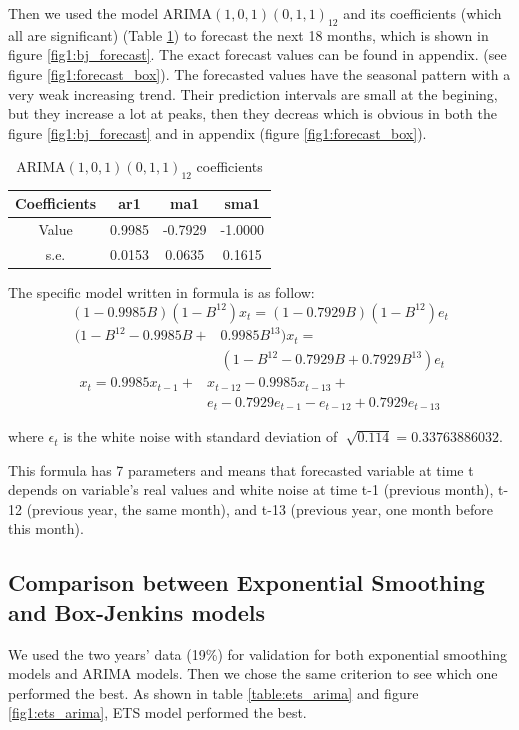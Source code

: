 \documentclass[journal, a4paper]{IEEEtran}
\begin{document}
Then we used the model ARIMA$(1,0,1)(0,1,1)_{12}$ and its coefficients (which all are significant) (Table \ref{table:ARIMA$(1,0,1)(0,1,1)_{12}$}) to forecast the next 18 months, which is shown in figure \ref{fig1:bj_forecast}. The exact forecast values can be found in appendix. (see figure \ref{fig1:forecast_box}).
The forecasted values have the seasonal pattern with a very weak increasing trend. Their prediction intervals are small at the begining, but they increase a lot at peaks, then they decreas which is obvious in both the figure \ref{fig1:bj_forecast} and in appendix (figure \ref{fig1:forecast_box}).

\begin{table}[H]
\caption{ARIMA$(1,0,1)(0,1,1)_{12}$ coefficients}
\label{table:ARIMA$(1,0,1)(0,1,1)_{12}$}
\centering
\begin{tabular}{|c|c|c|c|}
\hline
Coefficients & ar1 & ma1 & sma1 \\ \hline
Value & 0.9985 & -0.7929 & -1.0000 \\  \hline
s.e. & 0.0153 & 0.0635 & 0.1615\\
\hline
\end{tabular}
\end{table}

The specific model written in formula is as follow:
$$(1-0.9985B)(1-B^{12})x_{t}=(1-0.7929B)(1-B^{12})e_{t}$$
\begin{align*}
(1-B^{12}-0.9985B+& 0.9985B^{13})x_{t}=\\
& (1-B^{12}-0.7929B+0.7929B^{13})e_{t}
\end{align*}
\begin{align*}
x_{t}=0.9985x_{t-1}+ & x_{t-12}-0.9985x_{t-13}+ \\ & e_{t}-0.7929e_{t-1}-e_{t-12}+0.7929e_{t-13}
\end{align*}

where $\epsilon_{t}$ is the white noise with standard deviation of $\sqrt[]{0.114}=0.33763886032$.

This formula has 7 parameters and means that forecasted variable at time t depends on variable's real values and white noise at time t-1 (previous month), t-12 (previous year, the same month), and t-13 (previous year, one month before this month). 



\subsection{Comparison between Exponential Smoothing and Box-Jenkins models}
We used the two years' data (19\%) for validation for both exponential smoothing models and ARIMA models. Then we chose the same criterion to see which one performed the best.
As shown in table \ref{table:ets_arima} and figure \ref{fig1:ets_arima}, ETS model performed the best.
\end{document}
